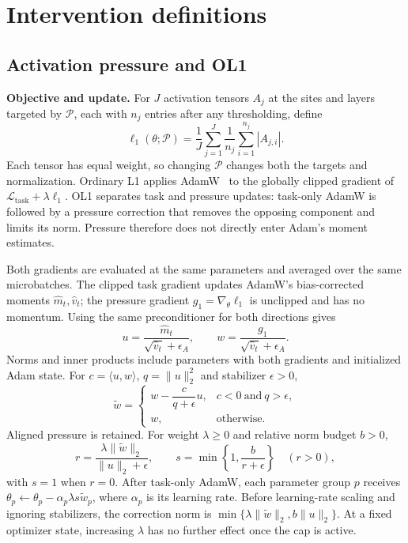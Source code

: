 \section{Intervention definitions}
\label{app:interventions}

\subsection{Activation pressure and OL1}
\label{app:pressure}

\textbf{Objective and update.}
For $J$ activation tensors $A_j$ at the sites and layers targeted by
$\mathcal P$, each with $n_j$ entries after any thresholding, define
\begin{equation}
\ell_1(\theta;\mathcal P)=\frac{1}{J}\sum_{j=1}^{J}\frac{1}{n_j}
\sum_{i=1}^{n_j}|A_{j,i}|.
\end{equation}
Each tensor has equal weight, so changing $\mathcal P$ changes both the
targets and normalization. Ordinary L1 applies AdamW~\citep{loshchilov2019adamw}
to the globally clipped gradient of $\mathcal L_{\mathrm{task}}+\lambda\ell_1$.
OL1 separates task and pressure updates: task-only AdamW is followed by a
pressure correction that removes the opposing component and limits its norm.
Pressure therefore does not directly enter Adam's moment estimates.

Both gradients are evaluated at the same parameters and averaged over the
same microbatches. The clipped task gradient updates AdamW's bias-corrected
moments $\widehat m_t,\widehat v_t$; the pressure gradient
$g_1=\nabla_\theta\ell_1$ is unclipped and has no momentum. Using the same
preconditioner for both directions gives
\begin{equation}
u=\frac{\widehat m_t}{\sqrt{\widehat v_t}+\epsilon_A},
\qquad
w=\frac{g_1}{\sqrt{\widehat v_t}+\epsilon_A}.
\end{equation}
Norms and inner products include parameters with both gradients and initialized
Adam state. For $c=\langle u,w\rangle$, $q=\|u\|_2^2$ and stabilizer $\epsilon>0$,
\begin{equation}
\widetilde w=
\begin{cases}
w-\dfrac{c}{q+\epsilon}u, & c<0\ \text{and}\ q>\epsilon,\\[3pt]
w, & \text{otherwise}.
\end{cases}
\label{eq:ol1-projection}
\end{equation}
Aligned pressure is retained. For weight $\lambda\geq0$ and relative norm budget $b>0$,
\begin{equation}
r=\frac{\lambda\|\widetilde w\|_2}{\|u\|_2+\epsilon},
\qquad
s=\min\!\left\{1,\frac{b}{r+\epsilon}\right\}\quad(r>0),
\end{equation}
with $s=1$ when $r=0$. After task-only AdamW, each parameter group $p$ receives
$\theta_p\leftarrow\theta_p-\alpha_p\lambda s\widetilde w_p$, where
$\alpha_p$ is its learning rate. Before learning-rate scaling and ignoring
stabilizers, the correction norm is
$\min\{\lambda\|\widetilde w\|_2,b\|u\|_2\}$. At a fixed optimizer state,
increasing $\lambda$ has no further effect once the cap is active.

